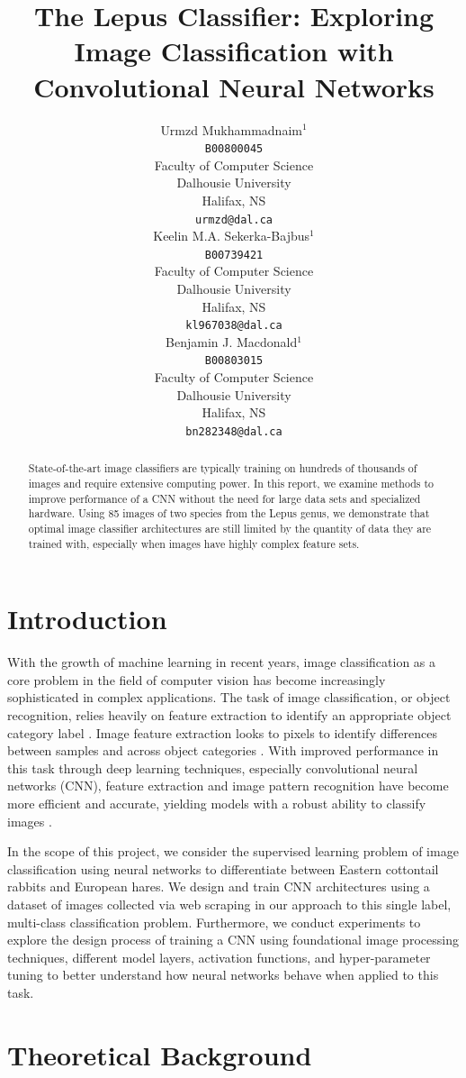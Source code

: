 \documentclass{article}
\title{The Lepus Classifier: Exploring Image Classification with Convolutional Neural Networks}
\author{%
  Urmzd
  Mukhammadnaim$^1$\\
  \texttt{B00800045}\\
  Faculty of Computer Science\\
  Dalhousie University\\
  Halifax, NS  \\
  \texttt{urmzd@dal.ca} \\
  \And
  Keelin M.A.
  Sekerka-Bajbus$^1$\\
  \texttt{B00739421}\\
  Faculty of Computer Science\\
  Dalhousie University\\
  Halifax, NS  \\
  \texttt{kl967038@dal.ca} \\
  \AND
  Benjamin J. Macdonald$^1$ \\
  \texttt{B00803015}\\
  Faculty of Computer Science\\
  Dalhousie University\\
  Halifax, NS  \\
  \texttt{bn282348@dal.ca} \\
}
\begin{document}
\maketitle
\begin{abstract}
  State-of-the-art image classifiers are typically training on hundreds of thousands of images and require extensive computing power. In this report, we examine methods to improve performance of a CNN without the need for large data sets and specialized hardware. Using 85 images of two species from the Lepus genus, we demonstrate that optimal image classifier architectures are still limited by the quantity of data they are trained with, especially when images have highly complex feature sets.

\end{abstract}

\section{Introduction}

With the growth of machine learning in recent years, image classification as a core problem in the field of computer vision has become increasingly sophisticated in complex applications. The task of image classification, or object recognition, relies heavily on feature extraction to identify an appropriate object category label \cite{SHARMA2018377,8078730}. Image feature extraction looks to pixels to identify differences between samples and across object categories \cite{SHARMA2018377}. With improved performance in this task through deep learning techniques, especially convolutional neural networks (CNN), feature extraction and image pattern recognition have become more efficient and accurate, yielding models with a robust ability to classify images \cite{SHARMA2018377,8078730}.

In the scope of this project, we consider the supervised learning problem of image classification using neural networks to differentiate between Eastern cottontail rabbits and European hares. We design and train CNN architectures using a dataset of images collected via web scraping in our approach to this single label, multi-class classification problem. Furthermore, we conduct experiments to explore the design process of training a CNN using foundational image processing techniques, different model layers, activation functions, and hyper-parameter tuning to better understand how neural networks behave when applied to this task.

\section{Theoretical Background}
\end{document}
